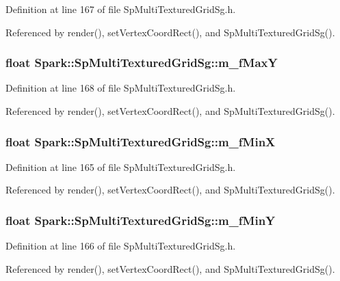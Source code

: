 Definition at line 167 of file Sp\-Multi\-Textured\-Grid\-Sg.h.

Referenced by render(), set\-Vertex\-Coord\-Rect(), and Sp\-Multi\-Textured\-Grid\-Sg().
\subsubsection{\setlength{\rightskip}{0pt plus 5cm}float {\bf Spark::Sp\-Multi\-Textured\-Grid\-Sg::m\_\-f\-Max\-Y}\hspace{0.3cm}{\tt  [protected]}}\label{classSpark_1_1SpMultiTexturedGridSg_p6}


Definition at line 168 of file Sp\-Multi\-Textured\-Grid\-Sg.h.

Referenced by render(), set\-Vertex\-Coord\-Rect(), and Sp\-Multi\-Textured\-Grid\-Sg().
\subsubsection{\setlength{\rightskip}{0pt plus 5cm}float {\bf Spark::Sp\-Multi\-Textured\-Grid\-Sg::m\_\-f\-Min\-X}\hspace{0.3cm}{\tt  [protected]}}\label{classSpark_1_1SpMultiTexturedGridSg_p3}


Definition at line 165 of file Sp\-Multi\-Textured\-Grid\-Sg.h.

Referenced by render(), set\-Vertex\-Coord\-Rect(), and Sp\-Multi\-Textured\-Grid\-Sg().
\subsubsection{\setlength{\rightskip}{0pt plus 5cm}float {\bf Spark::Sp\-Multi\-Textured\-Grid\-Sg::m\_\-f\-Min\-Y}\hspace{0.3cm}{\tt  [protected]}}\label{classSpark_1_1SpMultiTexturedGridSg_p4}


Definition at line 166 of file Sp\-Multi\-Textured\-Grid\-Sg.h.

Referenced by render(), set\-Vertex\-Coord\-Rect(), and Sp\-Multi\-Textured\-Grid\-Sg().
